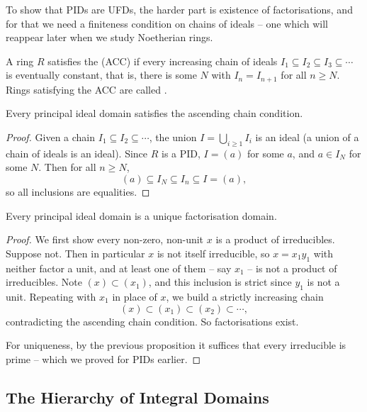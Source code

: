 \documentclass[a4paper]{scrartcl}
\begin{document}
To show that PIDs are UFDs, the harder part is existence of factorisations, and for that we need a finiteness condition on chains of ideals -- one which will reappear later when we study Noetherian rings.

\begin{definition}
	A ring $R$ satisfies the  (ACC) if every increasing chain of ideals $I_1 \subseteq I_2 \subseteq I_3 \subseteq \cdots$ is eventually constant, that is, there is some $N$ with $I_n = I_{n+1}$ for all $n \geq N$. Rings satisfying the ACC are called .
\end{definition}

\begin{lemma}
	Every principal ideal domain satisfies the ascending chain condition.
\end{lemma}
\begin{proof}
	Given a chain $I_1 \subseteq I_2 \subseteq \cdots$, the union $I = \bigcup_{i \geq 1} I_i$ is an ideal (a union of a chain of ideals is an ideal). Since $R$ is a PID, $I = (a)$ for some $a$, and $a \in I_N$ for some $N$. Then for all $n \geq N$,
	$$
	(a) \subseteq I_N \subseteq I_n \subseteq I = (a),
	$$
	so all inclusions are equalities.
\end{proof}

\begin{theorem}
	Every principal ideal domain is a unique factorisation domain.
\end{theorem}
\begin{proof}
	We first show every non-zero, non-unit $x$ is a product of irreducibles. Suppose not. Then in particular $x$ is not itself irreducible, so $x = x_1 y_1$ with neither factor a unit, and at least one of them -- say $x_1$ -- is not a product of irreducibles. Note $(x) \subset (x_1)$, and this inclusion is strict since $y_1$ is not a unit. Repeating with $x_1$ in place of $x$, we build a strictly increasing chain
	$$
	(x) \subset (x_1) \subset (x_2) \subset \cdots,
	$$
	contradicting the ascending chain condition. So factorisations exist.

	For uniqueness, by the previous proposition it suffices that every irreducible is prime -- which we proved for PIDs earlier.
\end{proof}

\subsection{The Hierarchy of Integral Domains}
\end{document}
